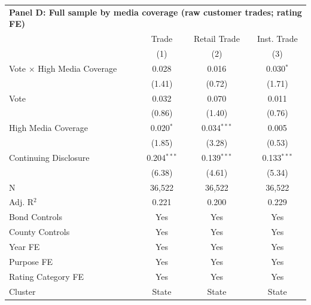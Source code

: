 \begingroup
\centering
\begin{tabular*}{\textwidth}{@{\extracolsep{\fill}}lccc}
\multicolumn{5}{l}{\textbf{Panel D: Full sample by media coverage (raw customer trades; rating FE)}}\\

\addlinespace
   \toprule
                                      & Trade         & Retail Trade  & Inst. Trade\\  
                                      & (1)           & (2)           & (3)\\  
   \midrule 
   Vote $\times$ High Media Coverage  & 0.028         & 0.016         & 0.030$^{*}$\\   
                                      & (1.41)       & (0.72)       & (1.71)\\   
   Vote                               & 0.032         & 0.070         & 0.011\\   
                                      & (0.86)       & (1.40)       & (0.76)\\   
   High Media Coverage                & 0.020$^{*}$   & 0.034$^{***}$ & 0.005\\   
                                      & (1.85)       & (3.28)       & (0.53)\\   
   Continuing Disclosure              & 0.204$^{***}$ & 0.139$^{***}$ & 0.133$^{***}$\\   
                                      & (6.38)       & (4.61)       & (5.34)\\   
   \hline
   N                       & 36,522        & 36,522        & 36,522\\  
   Adj. R$^2$                     & 0.221         & 0.200         & 0.229\\  
   Bond Controls                      & Yes           & Yes           & Yes\\  
   County Controls                    & Yes           & Yes           & Yes\\  
   Year FE                            & Yes           & Yes           & Yes\\  
   Purpose FE                         & Yes           & Yes           & Yes\\  
   Rating Category FE                 & Yes           & Yes           & Yes\\  
   Cluster              & State & State & State\\  
   \bottomrule
\end{tabular*}
\par\endgroup
